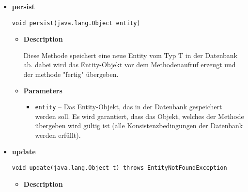 \documentclass[11pt,a4paper]{report}
\begin{document}
{{{{{{{{{\begin{itemize}
{\begin{itemize}
{Diese Methode gibt ein Entity-Objekt zurück, das anhand seines Primärschlüssels aus der Datenbank geholt wurde.
}
\item{
{\bf  Parameters}
  \begin{itemize}
   \item{
\texttt{key} -- Der Primärschlüssel der Entity, die aus der Datenbank geholt werden soll. Der Datentyp wird von dem Generic PK bestimmt, mit dem das Interface implementiert wird.}
  \end{itemize}
}%
\item{{\bf  Returns} -- 
Ein Entity-Objekt, das durch den Schlüssel identifiziert wurde. Konnte keine passende Entity in der Datenbank gefunden werden, gibt die Methode null zurück. 
}%
\end{itemize}
}%
\item{ 
\hypertarget{edu.kit.pse17.go_app.PersistenceLayer.daos.AbstractDao.persist(T)}{{\bf  persist}\\}
\begin{lstlisting}[frame=none]
void persist(java.lang.Object entity)\end{lstlisting} %
\begin{itemize}
\item{
{\bf  Description}

Diese Methode speichert eine neue Entity vom Typ T in der Datenbank ab. dabei wird das Entity-Objekt vor dem Methodenaufruf erzeugt und der methode "fertig" übergeben.
}
\item{
{\bf  Parameters}
  \begin{itemize}
   \item{
\texttt{entity} -- Das Entity-Objekt, das in der Datenbank gespeichert werden soll. Es wird garantiert, dass das Objekt, welches der Methode übergeben wird gültig ist (alle Konsistenzbedingungen der Datenbank werden erfüllt).}
  \end{itemize}
}%
\end{itemize}
}%
\item{ 
\hypertarget{edu.kit.pse17.go_app.PersistenceLayer.daos.AbstractDao.update(T)}{{\bf  update}\\}
\begin{lstlisting}[frame=none]
void update(java.lang.Object t) throws EntityNotFoundException\end{lstlisting} %
\begin{itemize}
\item{
{\bf  Description}

}
\end{itemize}}
\end{itemize}}}}}}}}}}
\end{document}
